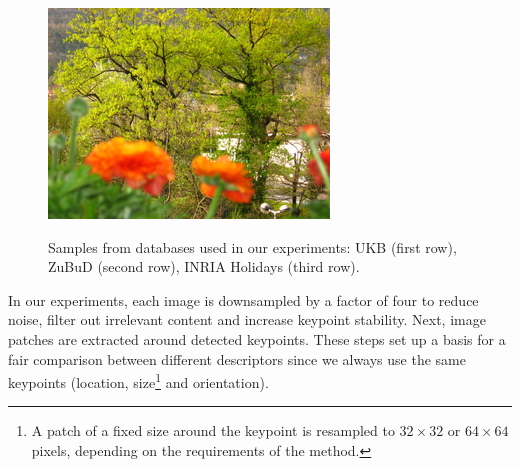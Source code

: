 \documentclass[10pt,conference,a4paper]{IEEEtran}
\begin{document}
\begin{figure}
{				\includegraphics[scale=0.82]{inria6.jpg}
			}

			\caption
			{
				Samples from databases used in our experiments:
				UKB \cite{ukb} (first row),
				ZuBuD \cite{zubud} (second row),
				INRIA Holidays \cite{holidays} (third row).
			}
			\label{fig:databases}
		\end{figure}

		In our experiments, each image is downsampled by a factor of four to reduce noise, filter out irrelevant content and increase keypoint stability.
		Next, image patches are extracted around detected keypoints.
		These steps set up a basis for a fair comparison between different descriptors since we always use the same keypoints
		(location, size\footnote{A patch of a fixed size around the keypoint is resampled to $32\times 32$ or $64\times 64$ pixels, depending on the requirements of the method.} and orientation).
\end{document}
